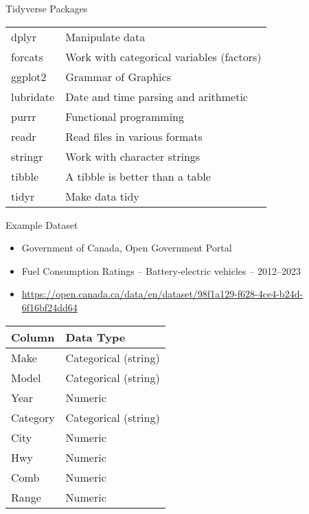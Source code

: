 \documentclass[ignorenonframetext,xcolor=x11names]{beamer}
\begin{document}
\begin{frame}{Tidyverse Packages}
\renewcommand{\arraystretch}{1.25}
\centering

\begin{tabular}{l|l} \hline
dplyr & Manipulate data \\
forcats & Work with categorical variables (factors) \\
ggplot2 & Grammar of Graphics \\
lubridate & Date and time parsing and arithmetic \\
purrr & Functional programming \\
readr & Read files in various formats \\
stringr & Work with character strings \\
tibble & A tibble is better than a table \\
tidyr & Make data tidy \\ \hline
\end{tabular}
\end{frame}

\begin{frame}{Example Dataset}
\begin{itemize}
  \item Government of Canada, Open Government Portal
  \item Fuel Consumption Ratings -- Battery-electric vehicles -- 2012--2023
  \item \href{https://open.canada.ca/data/en/dataset/98f1a129-f628-4ce4-b24d-6f16bf24dd64}{https://open.canada.ca/data/en/dataset/98f1a129-f628-4ce4-b24d-6f16bf24dd64}
\end{itemize} 

\vspace{\baselineskip}
\centering
\footnotesize

	\begin{tabular}{|l|l|} \hline
	  {\bf Column} & {\bf Data Type} \\ \hline \hline
	  Make & Categorical (string) \\ 
	  Model & Categorical (string) \\
	  Year & Numeric \\
	  Category & Categorical (string)\\
	  City & Numeric \\
	  Hwy & Numeric \\
	  Comb & Numeric \\
	  Range & Numeric \\ \hline
	\end{tabular}
\end{frame}
\end{document}
